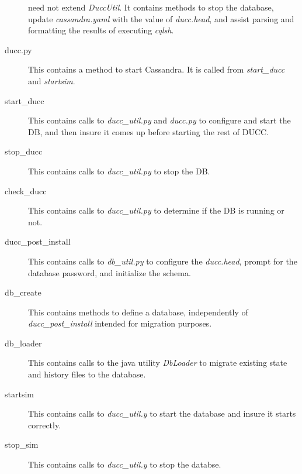 \begin{description}
            need not extend {\em DuccUtil}.  It contains methods to stop the database, update 
            {\em cassandra.yaml} with the value of {\em ducc.head}, and assist parsing and formatting
            the results of executing {\em cqlsh}.
          \item[ducc.py] This contains a method to start Cassandra.  It is called from {\em start\_ducc}
            and {\em startsim}.
          \item[start\_ducc] This contains calls to {\em ducc\_util.py}  and {\em ducc.py} to configure
            and start the DB, and then insure it comes up before starting the rest of DUCC.
          \item[stop\_ducc] This contains calls to {\em ducc\_util.py} to stop the DB.
          \item[check\_ducc] This contains calls to {\em ducc\_util.py} to determine if the DB is running or not.
          \item[ducc\_post\_install] This contains calls to {\em db\_util.py} to configure the
            {\em ducc.head}, prompt for the database password, and initialize the schema.
          \item[db\_create] This contains methods to define a database, independently of
            {\em ducc\_post\_install} intended for migration purposes.
          \item[db\_loader] This contains calls to the java utility {\em DbLoader} to
            migrate existing state and history files to the database.
          \item[startsim] This contains calls to {\em ducc\_util.y} to start the database and
            insure it starts correctly.
          \item[stop\_sim] This contains calls to {\em ducc\_util.y} to stop the databse.
          \end{description}
          

